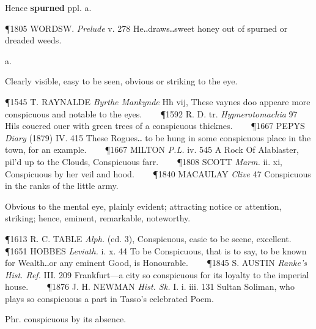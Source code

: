 \begin{description}[wide, labelwidth=!, labelindent=0pt]
\begin{myenumerate}
\noindent Hence \textbf{spurned} ppl. a.

\P 1805 WORDSW.  \textit{Prelude} v. 278 He‥draws‥sweet honey out of spurned or dreaded weeds.



\end{myenumerate}


 a.

\noindent {}

\vspace{-0.3cm}

\begin{myenumerate}

 Clearly visible, easy to be seen, obvious or striking to the eye.

\P 1545 T. RAYNALDE  \textit{Byrthe Mankynde} Hh vij, These vaynes doo appeare more conspicuous and notable to the eyes.    
\P 1592 R. D. tr.  \textit{Hypnerotomachia} 97 Hils couered ouer with green trees of a conspicuous thicknes.    
\P 1667 PEPYS  \textit{Diary} (1879) IV. 415 These Rogues‥ to be hung in some conspicuous place in the town, for an example.    
\P 1667 MILTON  \textit{P.L.} iv. 545 A Rock Of Alablaster, pil'd up to the Clouds, Conspicuous farr.    
\P 1808 SCOTT  \textit{Marm.} ii. xi, Conspicuous by her veil and hood.    
\P 1840 MACAULAY  \textit{Clive} 47 Conspicuous in the ranks of the little army.

 Obvious to the mental eye, plainly evident; attracting notice or attention, striking; hence, eminent, remarkable, noteworthy.

\P 1613 R. C. TABLE  \textit{Alph.} (ed. 3), Conspicuous, easie to be seene, excellent.    
\P 1651 HOBBES  \textit{Leviath.} i. x. 44 To be Conspicuous, that is to say, to be known for Wealth‥or any eminent Good, is Honourable.    
\P 1845 S. AUSTIN  \textit{Ranke's Hist. Ref.} III. 209 Frankfurt—a city so conspicuous for its loyalty to the imperial house.    
\P 1876 J. H. NEWMAN  \textit{Hist. Sk.} I. i. iii. 131 Sultan Soliman, who plays so conspicuous a part in Tasso's celebrated Poem.

 Phr. conspicuous by its absence.


\end{myenumerate}
\end{description}
